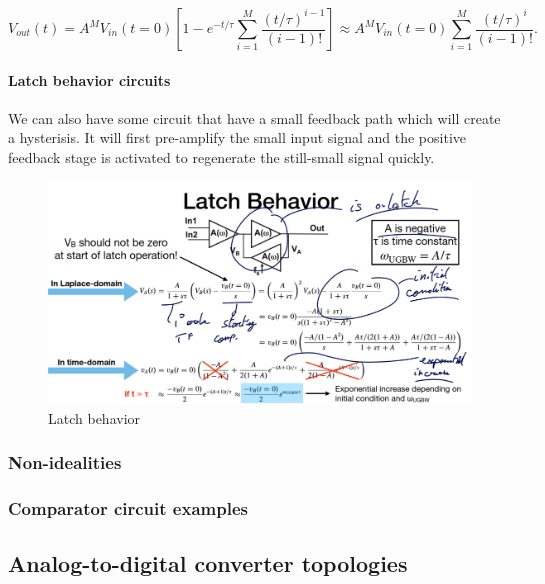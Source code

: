 \documentclass[
  a4paper,
]{article}
\begin{document}
\[V_{out}(t) = A^M V_{in}(t=0) \left[ 1 - e^{-t/\tau} \sum_{i=1}^{M} \frac{(t/\tau)^{i-1}}{(i-1)!} \right] \approx A^M V_{in}(t=0) \sum_{i=1}^{M} \frac{(t/\tau)^{i}}{(i-1)!}.\]

\hypertarget{latch-behavior-circuits}{%
\paragraph{Latch behavior circuits}\label{latch-behavior-circuits}}

We can also have some circuit that have a small feedback path which will
create a hysterisis. It will first pre-amplify the small input signal
and the positive feedback stage is activated to regenerate the
still-small signal quickly.

\begin{figure}
\hypertarget{fig:enter-label}{%
\centering
\includegraphics{latch_behavior.png}
\caption{Latch behavior}\label{fig:enter-label}
}
\end{figure}

\hypertarget{non-idealities-1}{%
\subsubsection{Non-idealities}\label{non-idealities-1}}

\hypertarget{comparator-circuit-examples}{%
\subsubsection{Comparator circuit
examples}\label{comparator-circuit-examples}}

\hypertarget{analog-to-digital-converter-topologies}{%
\subsection{Analog-to-digital converter
topologies}\label{analog-to-digital-converter-topologies}}
\end{document}

